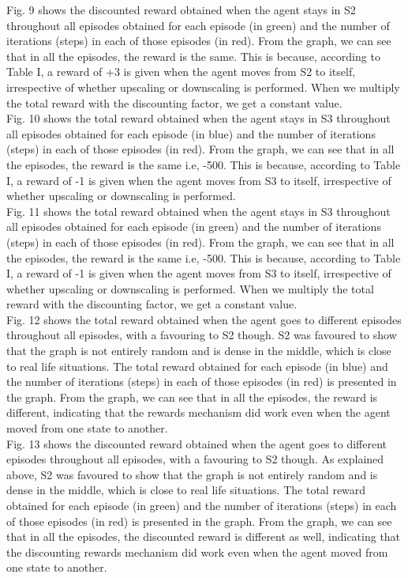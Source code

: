 \documentclass[conference]{IEEEtran}
\begin{document}
Fig. 9 shows the discounted reward obtained when the agent stays in S2 throughout all episodes obtained for each episode (in green) and the number of iterations (steps) in each of those episodes (in red). From the graph, we can see that in all the episodes, the reward is the same. This is because, according to Table I, a reward of +3 is given when the agent moves from S2 to itself, irrespective of whether upscaling or downscaling is performed. When we multiply the total reward with the discounting factor, we get a constant value. \\

Fig. 10 shows the total reward obtained when the agent stays in S3 throughout all episodes obtained for each episode (in blue) and the number of iterations (steps) in each of those episodes (in red). From the graph, we can see that in all the episodes, the reward is the same i.e, -500. This is because, according to Table I, a reward of -1 is given when the agent moves from S3 to itself, irrespective of whether upscaling or downscaling is performed. \\

Fig. 11 shows the total reward obtained when the agent stays in S3 throughout all episodes obtained for each episode (in green) and the number of iterations (steps) in each of those episodes (in red). From the graph, we can see that in all the episodes, the reward is the same i.e, -500. This is because, according to Table I, a reward of -1 is given when the agent moves from S3 to itself, irrespective of whether upscaling or downscaling is performed. When we multiply the total reward with the discounting factor, we get a constant value. \\

Fig. 12 shows the total reward obtained when the agent goes to different episodes throughout all episodes, with a favouring to S2 though. S2 was favoured to show that the graph is not entirely random and is dense in the middle, which is close to real life situations. The total reward obtained for each episode (in blue) and the number of iterations (steps) in each of those episodes (in red) is presented in the graph. From the graph, we can see that in all the episodes, the reward is different, indicating that the rewards mechanism did work even when the agent moved from one state to another. \\

Fig. 13 shows the discounted reward obtained when the agent goes to different episodes throughout all episodes, with a favouring to S2 though. As explained above, S2 was favoured to show that the graph is not entirely random and is dense in the middle, which is close to real life situations. The total reward obtained for each episode (in green) and the number of iterations (steps) in each of those episodes (in red) is presented in the graph. From the graph, we can see that in all the episodes, the discounted reward is different as well, indicating that the discounting rewards mechanism did work even when the agent moved from one state to another. \\
\end{document}

